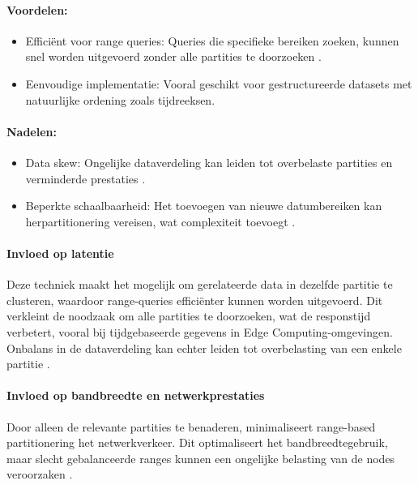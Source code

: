 \paragraph{Voordelen:}
\begin{itemize}
    \item Efficiënt voor range queries: Queries die specifieke bereiken zoeken, kunnen snel worden uitgevoerd zonder alle partities te doorzoeken \autocite{Ponnusamy2024, Kleppmann2017}.
    \item Eenvoudige implementatie: Vooral geschikt voor gestructureerde datasets met natuurlijke ordening zoals tijdreeksen.
\end{itemize}

\paragraph{Nadelen:}
\begin{itemize}
    \item Data skew: Ongelijke dataverdeling kan leiden tot overbelaste partities en verminderde prestaties \autocite{Ponnusamy2024}.
    \item Beperkte schaalbaarheid: Het toevoegen van nieuwe datumbereiken kan herpartitionering vereisen, wat complexiteit toevoegt \autocite{Kleppmann2017}.
\end{itemize}

\paragraph{Invloed op latentie} 
Deze techniek maakt het mogelijk om gerelateerde data in dezelfde partitie te clusteren, waardoor range-queries efficiënter kunnen worden uitgevoerd. Dit verkleint de noodzaak om alle partities te doorzoeken, wat de responstijd verbetert, vooral bij tijdgebaseerde gegevens in Edge Computing-omgevingen. Onbalans in de dataverdeling kan echter leiden tot overbelasting van een enkele partitie \autocite{Mahmud2020}.

\paragraph{Invloed op bandbreedte en netwerkprestaties} 
Door alleen de relevante partities te benaderen, minimaliseert range-based partitionering het netwerkverkeer. Dit optimaliseert het bandbreedtegebruik, maar slecht gebalanceerde ranges kunnen een ongelijke belasting van de nodes veroorzaken \autocite{Ponnusamy2024}.

